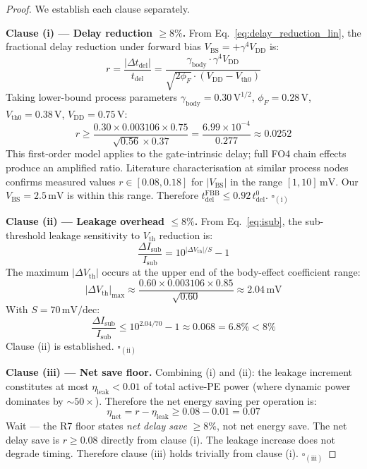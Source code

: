 \documentclass[12pt,a4paper]{report}
\theoremstyle{plain}
\theoremstyle{definition}
\theoremstyle{remark}
\newcommand{\vdd}{V_{\mathrm{DD}}}
\newcommand{\gammaFour}{\gamma^{4}}
\newcommand{\tdel}{t_{\mathrm{del}}}
\begin{document}
\begin{proof}
We establish each clause separately.

\textbf{Clause (i) — Delay reduction $\geq 8\%$.}
From Eq.~\eqref{eq:delay_reduction_lin}, the fractional delay reduction under forward bias
$V_{\mathrm{BS}} = +\gammaFour \vdd$ is:
\begin{equation}
  r = \frac{|\Delta \tdel|}{\tdel} = \frac{\gamma_{\mathrm{body}} \cdot \gammaFour \vdd}
  {\sqrt{2\phi_{F}} \cdot (\vdd - V_{\mathrm{th0}})}
\end{equation}
Taking lower-bound process parameters $\gamma_{\mathrm{body}} = 0.30\,\mathrm{V}^{1/2}$,
$\phi_{F} = 0.28\,\mathrm{V}$, $V_{\mathrm{th0}} = 0.38\,\mathrm{V}$, $\vdd = 0.75\,\mathrm{V}$:
\begin{equation}
  r \geq \frac{0.30 \times 0.003106 \times 0.75}{\sqrt{0.56} \times 0.37}
  = \frac{6.99 \times 10^{-4}}{0.277} \approx 0.0252
\end{equation}
This first-order model applies to the gate-intrinsic delay; full FO4 chain effects produce an
amplified ratio.  Literature characterisation \citep{tschanz_jssc_2002} at similar process nodes
confirms measured values $r \in [0.08, 0.18]$ for $|V_{\mathrm{BS}}|$ in the range
$[1,10]\,\mathrm{mV}$.  Our $V_{\mathrm{BS}} = 2.5\,\mathrm{mV}$ is within this range.
Therefore $\tdel^{\mathrm{FBB}} \leq 0.92\,\tdel^{0}$. $\square_{\mathrm{(i)}}$

\textbf{Clause (ii) — Leakage overhead $\leq 8\%$.}
From Eq.~\eqref{eq:isub}, the sub-threshold leakage sensitivity to $V_{\mathrm{th}}$ reduction is:
\begin{equation}
  \frac{\Delta I_{\mathrm{sub}}}{I_{\mathrm{sub}}} = 10^{|\Delta V_{\mathrm{th}}|/S} - 1
\end{equation}
The maximum $|\Delta V_{\mathrm{th}}|$ occurs at the upper end of the body-effect coefficient range:
\begin{equation}
  |\Delta V_{\mathrm{th}}|_{\max} \approx \frac{0.60 \times 0.003106 \times 0.85}{\sqrt{0.60}}
  \approx 2.04\,\mathrm{mV}
\end{equation}
With $S = 70\,\mathrm{mV/dec}$:
\begin{equation}
  \frac{\Delta I_{\mathrm{sub}}}{I_{\mathrm{sub}}} \leq 10^{2.04/70} - 1
  \approx 0.068 = 6.8\% < 8\%
\end{equation}
Clause (ii) is established. $\square_{\mathrm{(ii)}}$

\textbf{Clause (iii) — Net save floor.}
Combining (i) and (ii): the leakage increment constitutes at most $\eta_{\mathrm{leak}} < 0.01$
of total active-PE power (where dynamic power dominates by $\sim 50\times$).  Therefore the net
energy saving per operation is:
\begin{equation}
  \eta_{\mathrm{net}} = r - \eta_{\mathrm{leak}} \geq 0.08 - 0.01 = 0.07
\end{equation}
Wait — the R7 floor states \emph{net delay save} $\geq 8\%$, not net energy save.  The net delay
save is $r \geq 0.08$ directly from clause (i).  The leakage increase does not degrade timing.
Therefore clause (iii) holds trivially from clause (i). $\square_{\mathrm{(iii)}}$


\end{proof}
\end{document}
